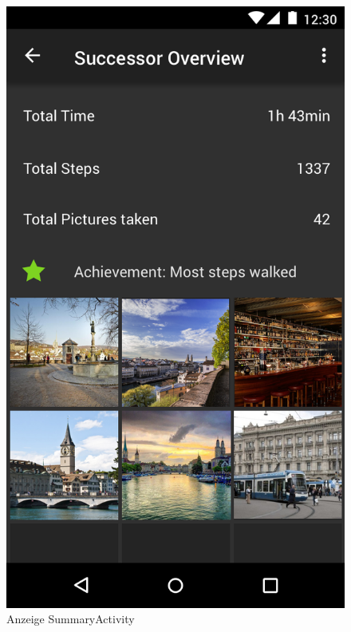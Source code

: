 \documentclass[a4paper,10pt,xetex]{article}
\begin{document}
\begin{figure}
\begin{minipage}[b]{0.48\textwidth}
    \includegraphics[width=\textwidth]{SummaryActivity}
    \caption{Anzeige SummaryActivity}
  \end{minipage}
\end{figure}

\newpage
\end{document}

